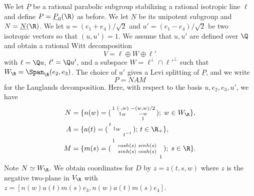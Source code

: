 We let  $\underline{P}$ be a rational parabolic subgroup stabilizing
a rational isotropic line $\ell$ and define $P= \underline{P}_0(\R)$
as before. We let $\underline{N}$ be its unipotent subgroup and $N
= \underline{N}(\R)$.
We let $u =(e_1+e_4)/\sqrt{2}$ and $u' =(e_1-e_4)/\sqrt{2}$ be two
isotropic vectors so that $(u,u')=1$. We assume that $u,u'$ are
defined over $\Q$ and obtain a rational Witt decomposition
\[
V = \ell \oplus W \oplus \ell'
\]
with $\ell = \Q u$, $\ell'=\Q u'$, and a subspace $W = \ell^{\perp}
\cap {\ell'}^{\perp}$ such that $W_{\R} = \Span_{\R}(e_2,e_3)$. The
choice of $u'$ gives a Levi splitting of $\underline{P}$, and we
write
\[
P =NAM
\]
for the Langlands decomposition. Here, with respect to the basis $u,e_2,e_3,u'$, we have  
\begin{align*}
{N} &=
 \{ n(w)   = ( 
\begin{smallmatrix}
1&(\cdot,w)& -(w,w)/2 \\
 &   1_W   & -w  \\
 &         & 1  \\
\end{smallmatrix} )
; \; w \in W_{\R} \}, \\ 
{A} &= \{ a(t) = 
( \begin{smallmatrix}
t& &  \\
 &   1_W   &  \\
 &         & t^{-1}\\
\end{smallmatrix} ); \, t \in \R_+
 \}, \\ 
{M} & =
\{ m(s)  =
( \begin{smallmatrix}
1& & \\
 &    \begin{smallmatrix} cosh(s) & sinh(s) \\ sinh(s) & cosh(s)
 \end{smallmatrix}    & \\\
 &         & 1  \\
\end{smallmatrix} )
; \; s \in \R \}.
\end{align*}
Note $N \simeq W_{\R}$. We obtain coordinates for $D$ by $z=z(t,s,w)$
where $z$ is the negative two-plane in $V_{\R}$ with
$z=[n(w)a(t)m(s)e_3,n(w)a(t)m(s)e_4]$.

